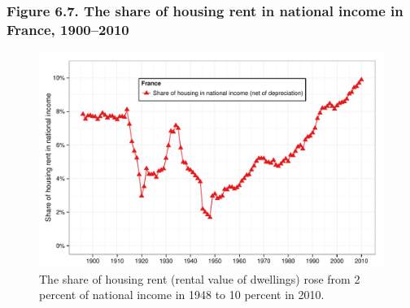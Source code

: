 \documentclass[t]{beamer}\usepackage[]{graphicx}\usepackage[]{color}
\newenvironment{knitrout}{}{} %
\begin{document}
\begin{frame}[label=Figure_6_7]
\frametitle{Figure 6.7. The share of housing rent in national income in France, 1900--2010}
\begin{figure}[t]
\begin{minipage}[b]{\textwidth}
\centering
\begin{knitrout}\footnotesize
{}\color{fgcolor}

{\centering \includegraphics[width=1\linewidth]{figures/color/Figure_6_7} 

}



\end{knitrout}
\caption{The share of housing rent (rental value of dwellings) rose from 2 percent of national income in 1948 to 10 percent in 2010.}
\end{minipage}
\end{figure}
\end{frame}
\end{document}

